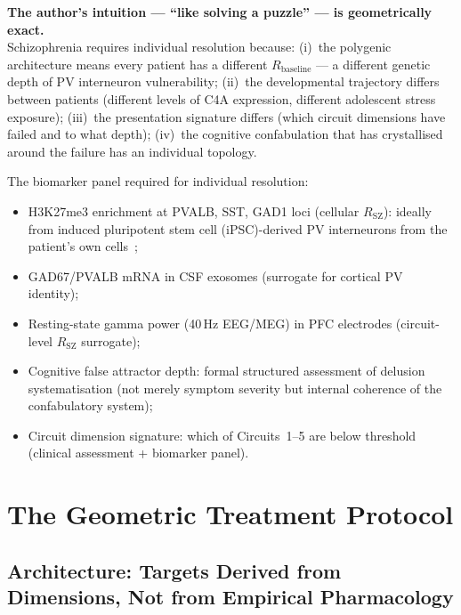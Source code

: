 \documentclass[12pt,a4paper]{article}
\newenvironment{warnenv}{%
  \begin{tcolorbox}[colback=red!5,colframe=warnbox,boxrule=1pt,
    arc=3pt,left=8pt,right=8pt,top=6pt,bottom=6pt,breakable]}{%
  \end{tcolorbox}}
\newcommand{\RSZ}{R_{\mathrm{SZ}}}
\begin{document}
\begin{warnenv}
\textbf{The author's intuition --- ``like solving a puzzle''
--- is geometrically exact.}\\[4pt]
Schizophrenia requires individual resolution because:
(i)~the polygenic architecture means every patient has a
different $R_{\mathrm{baseline}}$ --- a different genetic
depth of PV interneuron vulnerability; (ii)~the developmental
trajectory differs between patients (different levels of C4A
expression, different adolescent stress exposure); (iii)~the
presentation signature differs (which circuit dimensions
have failed and to what depth); (iv)~the cognitive
confabulation that has crystallised around the failure
has an individual topology.
\end{warnenv}

The biomarker panel required for individual resolution:

\begin{itemize}
  \item H3K27me3 enrichment at PVALB, SST, GAD1 loci
    (cellular $\RSZ$): ideally from induced pluripotent
    stem cell (iPSC)-derived PV interneurons from the
    patient's own cells~\cite{Maroof2013};
  \item GAD67/PVALB mRNA in CSF exosomes (surrogate for
    cortical PV identity);
  \item Resting-state gamma power (40\,Hz EEG/MEG) in
    PFC electrodes (circuit-level $\RSZ$ surrogate);
  \item Cognitive false attractor depth: formal structured
    assessment of delusion systematisation (not merely
    symptom severity but internal coherence of the
    confabulatory system);
  \item Circuit dimension signature: which of Circuits~1--5
    are below threshold (clinical assessment + biomarker
    panel).
\end{itemize}

\section{The Geometric Treatment Protocol}

\subsection{Architecture: Targets Derived from Dimensions,
Not from Empirical Pharmacology}
\end{document}

